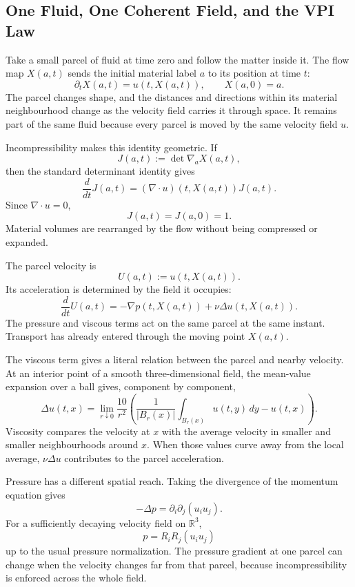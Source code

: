 \subsection{One Fluid, One Coherent Field, and the VPI Law}\label{sub:OneFluidOneCoherentFieldAndTheVPILaw}

Take a small parcel of fluid at time zero and follow the matter inside it.
The flow map \(X(a,t)\) sends the initial material label \(a\) to its position at time \(t\):
\[
  \partial_tX(a,t)=u(t,X(a,t)),
  \qquad
  X(a,0)=a.
\]
The parcel changes shape, and the distances and directions within its material neighbourhood change as the velocity field carries it through space.
It remains part of the same fluid because every parcel is moved by the same velocity field \(u\).

Incompressibility makes this identity geometric.
If
\[
  J(a,t):=\det\nabla_aX(a,t),
\]
then the standard determinant identity gives
\[
  \frac{d}{dt}J(a,t)
  =
  (\nabla\cdot u)(t,X(a,t))J(a,t).
\]
Since \(\nabla\cdot u=0\),
\[
  J(a,t)=J(a,0)=1.
\]
Material volumes are rearranged by the flow without being compressed or expanded.

The parcel velocity is
\[
  U(a,t):=u(t,X(a,t)).
\]
Its acceleration is determined by the field it occupies:
\[
  \frac{d}{dt}U(a,t)
  =
  -\nabla p(t,X(a,t))
  +
  \nu\Delta u(t,X(a,t)).
\]
The pressure and viscous terms act on the same parcel at the same instant.
Transport has already entered through the moving point \(X(a,t)\).

The viscous term gives a literal relation between the parcel and nearby velocity.
At an interior point of a smooth three-dimensional field, the mean-value expansion over a ball gives, component by component,
\[
  \Delta u(t,x)
  =
  \lim_{r\downarrow0}
  \frac{10}{r^2}
  \left(
    \frac{1}{|B_r(x)|}
    \int_{B_r(x)}u(t,y)\,dy
    -
    u(t,x)
  \right).
\]
Viscosity compares the velocity at \(x\) with the average velocity in smaller and smaller neighbourhoods around \(x\).
When those values curve away from the local average, \(\nu\Delta u\) contributes to the parcel acceleration.

Pressure has a different spatial reach.
Taking the divergence of the momentum equation gives
\[
  -\Delta p
  =
  \partial_i\partial_j(u_i u_j).
\]
For a sufficiently decaying velocity field on \(\mathbb R^3\),
\[
  p
  =
  R_iR_j(u_i u_j)
\]
up to the usual pressure normalization.
The pressure gradient at one parcel can change when the velocity changes far from that parcel, because incompressibility is enforced across the whole field.

